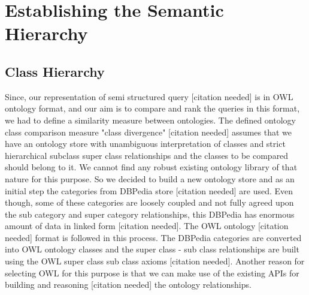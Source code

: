 \documentclass{www2010-submission}
\begin{document}
\section{Establishing the Semantic Hierarchy}

\subsection{Class Hierarchy} 
Since, our representation of semi structured query [citation needed] is in OWL ontology format, and our aim is to compare and rank the queries in this format, we had to define a similarity measure between ontologies. The defined ontology class comparison measure "class divergence" [citation needed] assumes that we have an ontology store with unambiguous interpretation of classes and strict hierarchical subclass super class relationships and the classes to be compared should belong to it. We cannot find any robust existing ontology library of that nature for this purpose. So we decided to build a new ontology store and as an initial step the categories from DBPedia store [citation needed] are used. Even though, some of these categories are loosely coupled and not fully agreed upon the sub category and super category relationships, this DBPedia has enormous amount of data in linked form [citation needed]. The OWL ontology [citation needed] format is followed in this process. The DBPedia categories are converted into OWL ontology classes and the super class - sub class relationships are built using the OWL super class sub class axioms [citation needed]. Another reason for selecting OWL for this purpose is that we can make use of the existing APIs for building and reasoning [citation needed] the ontology relationships.    


\end{document}
